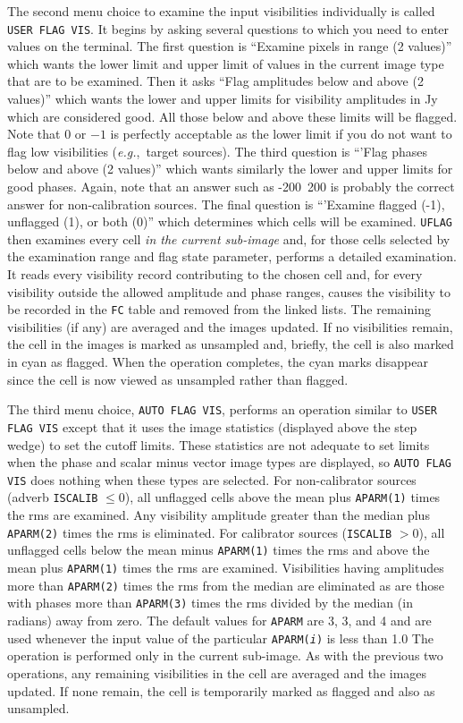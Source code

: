 \documentclass[twoside]{article}
\newcommand{\eg}{{\it e.g.},}
\begin{document}
The second menu choice to examine the input visibilities individually
is called {\tt USER FLAG VIS}\@.  It begins by asking several
questions to which you need to enter values on the terminal.  The
first question is ``Examine pixels in range (2 values)'' which wants
the lower limit and upper limit of values in the current image type
that are to be examined.  Then it asks ``Flag amplitudes below and
above (2 values)'' which wants the lower and upper limits for
visibility amplitudes in Jy which are considered good.  All those
below and above these limits will be flagged.  Note that 0 or $-1$ is
perfectly acceptable as the lower limit if you do not want to flag low
visibilities (\eg\ target sources).  The third question is ``'Flag
phases below and above (2 values)'' which wants similarly the lower
and upper limits for good phases.  Again, note that an answer such as
-200\ 200 is probably the correct answer for non-calibration sources.
The final question is ``'Examine flagged (-1), unflagged (1), or both
(0)'' which determines which cells will be examined.  {\tt UFLAG} then
examines every cell {\it in the current sub-image} and, for those
cells selected by the examination range and flag state parameter,
performs a detailed examination.  It reads every visibility record
contributing to the chosen cell and, for every visibility outside the
allowed amplitude and phase ranges, causes the visibility to be
recorded in the {\tt FC} table and removed from the linked lists.  The
remaining visibilities (if any) are averaged and the images updated.
If no visibilities remain, the cell in the images is marked as
unsampled and, briefly, the cell is also marked in cyan as flagged.
When the operation completes, the cyan marks disappear since the cell
is now viewed as unsampled rather than flagged.

The third menu choice, {\tt AUTO FLAG VIS}, performs an operation
similar to {\tt USER FLAG VIS} except that it uses the image
statistics (displayed above the step wedge) to set the cutoff limits.
These statistics are not adequate to set limits when the phase and
scalar minus vector image types are displayed, so {\tt AUTO FLAG VIS}
does nothing when these types are selected.  For non-calibrator
sources (adverb {\tt ISCALIB} $\leq 0$), all unflagged cells above
the mean plus {\tt APARM(1)} times the rms are examined.  Any
visibility amplitude greater than the median plus  {\tt APARM(2)}
times the rms is eliminated.  For calibrator sources ({\tt ISCALIB} $>
0$), all unflagged cells below the mean minus {\tt APARM(1)} times the
rms and above the mean plus {\tt APARM(1)} times the rms are examined.
Visibilities having amplitudes more than {\tt APARM(2)} times the
rms from the median are eliminated as are those with phases more than
{\tt APARM(3)} times the rms divided by the median (in radians) away
from zero.  The default values for {\tt APARM} are 3, 3, and 4 and are
used whenever the input value of the particular {\tt APARM({\it i})}
is less than 1.0  The operation is performed only in the current
sub-image.  As with the previous two operations, any remaining
visibilities in the cell are averaged and the images updated.  If none
remain, the cell is temporarily marked as flagged and also as
unsampled.
\end{document}
